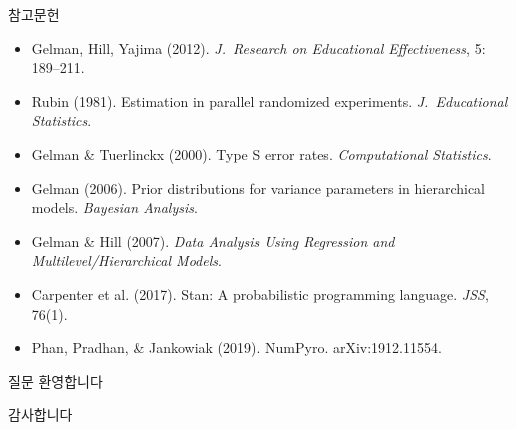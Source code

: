 \documentclass[10pt,aspectratio=169]{beamer}
\begin{document}
\begin{frame}{참고문헌}
\footnotesize
\begin{itemize}
\item Gelman, Hill, Yajima (2012). \emph{J.~Research on Educational Effectiveness}, 5: 189--211.
\item Rubin (1981). Estimation in parallel randomized experiments. \emph{J.~Educational Statistics}.
\item Gelman \& Tuerlinckx (2000). Type S error rates. \emph{Computational Statistics}.
\item Gelman (2006). Prior distributions for variance parameters in hierarchical models. \emph{Bayesian Analysis}.
\item Gelman \& Hill (2007). \emph{Data Analysis Using Regression and Multilevel/Hierarchical Models}.
\item Carpenter et al. (2017). Stan: A probabilistic programming language. \emph{JSS}, 76(1).
\item Phan, Pradhan, \& Jankowiak (2019). NumPyro. arXiv:1912.11554.
\end{itemize}
\end{frame}

\begin{frame}{질문 환영합니다}
\vfill
\begin{center}{\Huge 감사합니다}\end{center}
\vfill
\end{frame}
\end{document}
